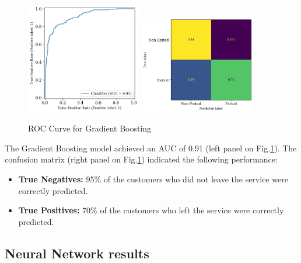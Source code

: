 \documentclass[12pt]{article}
\begin{document}
\begin{figure}[h!]
    \centering
    \includegraphics[width=0.45\textwidth]{figures/roc_curve_gb.png}
    \includegraphics[width=0.45\textwidth]{figures/confusion_matrix_gb.png}
    \caption{ROC Curve for Gradient Boosting}
    \label{fig:roc_curve_gb}
\end{figure}

The Gradient Boosting model achieved an AUC of 0.91 (left panel on Fig.\ref{fig:roc_curve_gb}). The confusion matrix (right panel on Fig.\ref{fig:roc_curve_gb}) indicated the following performance:
\begin{itemize}
    \item \textbf{True Negatives:} 95\% of the customers who did not leave the service were correctly predicted.
    \item \textbf{True Positives:} 70\% of the customers who left the service were correctly predicted.
\end{itemize}

\subsection{Neural Network results}
\end{document}
